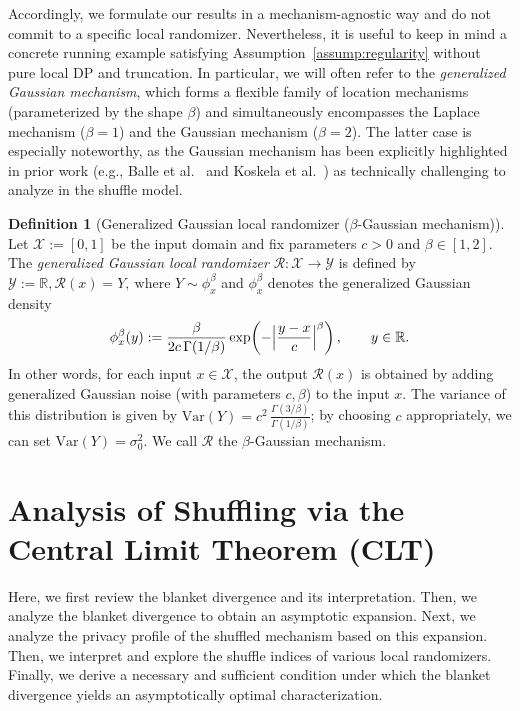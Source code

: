 \documentclass{article}
\theoremstyle{plain}
\theoremstyle{definition}
\newtheorem{definition}{Definition}[section]
\begin{document}
Accordingly, we formulate our results in a mechanism-agnostic way and do
not commit to a specific local randomizer.
Nevertheless, it is useful to keep in mind a concrete running example satisfying Assumption~\ref{assump:regularity} without pure local DP and truncation.
In particular, we will often refer to the \emph{generalized Gaussian
mechanism}, which forms a flexible family of location mechanisms (parameterized by the shape $\beta$) and simultaneously encompasses the Laplace mechanism
($\beta=1$) and the Gaussian mechanism ($\beta=2$).
The latter case is especially noteworthy, as the Gaussian mechanism has
been explicitly highlighted in prior work
(e.g., Balle et al.~\cite{ballePrivacyBlanketShuffle2019} and
Koskela et al.~\cite{koskelaNumericalAccountingShuffle2022}) as technically challenging to analyze in the shuffle
model.


\begin{definition}[Generalized Gaussian local randomizer ($\beta$-Gaussian mechanism)]
\label{def:generalized-gaussian-mechanism}
Let $\mathcal{X} := [0,1]$ be the input domain and fix
parameters $c>0$ and $\beta\in [1,2]$. The \emph{generalized Gaussian
local randomizer} $\mathcal{R}:\mathcal{X}\to\mathcal{Y}$ is defined by
$
  \mathcal{Y} := \mathbb{R},
  \mathcal{R}(x) = Y,\ \text{where } Y\sim\phi_x^{\beta}
$
and $\phi_x^{\beta}$ denotes the generalized Gaussian density
\[
  \phi_{x}^{\beta}(y)
  :=
  \frac{\beta}{2c\,\Gamma(1/\beta)}
  \exp\!\left(
    -\Bigl|\frac{y-x}{c}\Bigr|^{\beta}
  \right),
  \qquad y\in\mathbb{R}.
\]
In other words, for each input $x\in\mathcal{X}$, the output $\mathcal{R}(x)$ is obtained by adding generalized Gaussian noise (with parameters $c,\beta$) to the input $x$.
The variance of this distribution is given by $\mathrm{Var}(Y) = c^{2}\,\frac{\Gamma(3/\beta)}{\Gamma(1/\beta)}$; by choosing \(c\) appropriately, we can set
$
  \mathrm{Var}(Y)=\sigma_0^2.
$
We call $\mathcal{R}$ the $\beta$-Gaussian mechanism.
\end{definition}





\section{Analysis of Shuffling via the Central Limit Theorem (CLT)}
\label{sec:clt-analysis}


Here, we first review the blanket divergence and its interpretation.
Then, we analyze the blanket divergence to obtain an asymptotic expansion.
Next, we analyze the privacy profile of the shuffled mechanism based on this expansion.
Then, we interpret and explore the shuffle indices of various local randomizers.
Finally, we derive a necessary and sufficient condition under which the blanket divergence yields an asymptotically optimal characterization.
\end{document}
